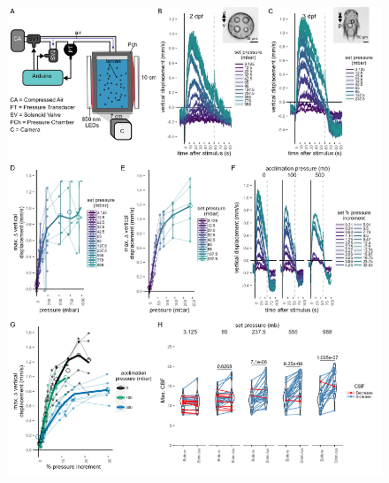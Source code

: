 \documentclass[
  11pt,
]{article}
\begin{document}
\begin{figure}[H]

{\centering \includegraphics[width=1\textwidth,height=\textheight]{Figures/Figure1.png}

}


\end{figure}
\end{document}
